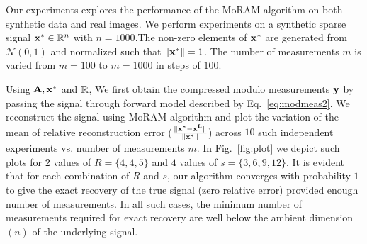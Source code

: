 Our experiments explores the performance of the MoRAM algorithm on both synthetic data and real images. We perform experiments on a synthetic sparse signal $\mathbf{x^*} \in {\mathbb{R}}^n$ with $n=1000$.The non-zero elements of $\mathbf{x^*}$ are generated from $\mathcal{N}(0,1)$ and normalized such that $\|\mathbf{x^*}\| =1$. The number of measurements $m$ is varied from $m = 100$ to $m=1000$ in steps of $100$. 


Using $\mathbf{A, x^*}$ and ${\mathbb{R}}$, We first obtain the compressed modulo measurements $\mathbf{y}$ by passing the signal through forward model described by Eq.~\ref{eq:modmeas2}. We reconstruct the signal using MoRAM algorithm and plot the variation of the mean of relative reconstruction error ($\frac{\|\mathbf{x^*-x^L}\|}{\|\mathbf{x^*}\|}$) across $10$ such independent experiments vs. number of measurements $m$. In Fig.~\ref{fig:plot} we depict such plots for $2$ values of $R=\{4,4,5\}$ and $4$ values of $s=\{3,6,9,12\}$. It is evident that for each combination of $R$ and $s$, our algorithm converges with probability $1$ to give the exact recovery of the true signal (zero relative error) provided enough number of measurements. In all such cases, the minimum number of measurements required for exact recovery are well below the ambient dimension $(n)$ of the underlying signal. 

